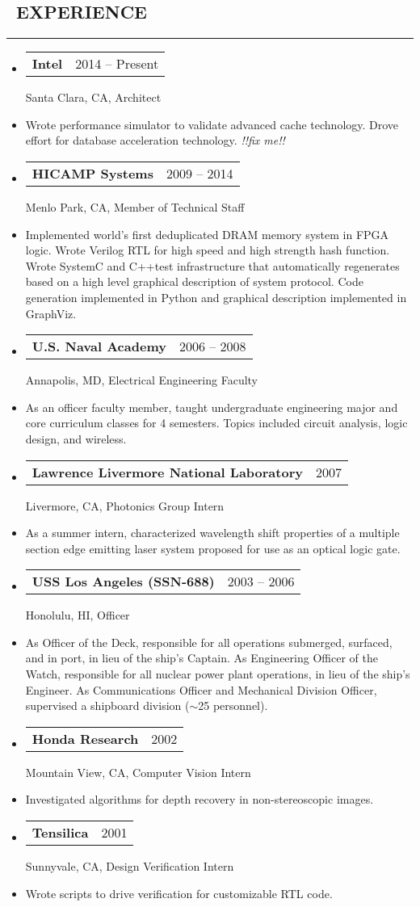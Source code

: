 \documentclass[10pt,letterpaper]{article}
\makeatletter
\newenvironment{resumesection}[1]
{%
    \subsection*{\ \textcolor{light-gray}{#1} }
    \vspace{-0.4em}
    \begin{samepage}
    \hrule
    \end{samepage}
    \vspace{+0.4em}
    \begin{itemize}[leftmargin=0.15cm]
        \parskip=0.1em
}%
{%
    \end{itemize}
}%
\newcommand{\myitem}[1] {
    \item[] \textcolor{dark-gray}{#1}
}
\newcommand{\headertri}[3] {
    \item[] \begin{tabular*}{\linewidth}{l@{\extracolsep{\fill}}r}
    \textbf{#1} & #2 \\
    \end{tabular*}
    #3
}
\newcommand{\CPP}
{C++}
\newcommand{\cminiw}{0.075}
\newcommand{\rminiw}{0.550}
\makeatother
\begin{document}
\begin{minipage}[t]{\cminiw\textwidth}
\end{minipage}\hfill
\begin{minipage}[t]{\rminiw\textwidth}
\begin{resumesection}{EXPERIENCE}
    \headertri
    {Intel}
    {2014 -- Present}
    {Santa Clara, CA, Architect}
    \myitem{Wrote performance simulator to validate advanced cache technology.
            Drove effort for database acceleration technology.
            \textit{!!fix me!!}}
    
    \headertri
    {HICAMP Systems}
    {2009 -- 2014}
    {Menlo Park, CA, Member of Technical Staff}
    \myitem{Implemented world's first deduplicated DRAM memory system in FPGA logic.
            Wrote Verilog RTL for high speed and high strength hash function.
            Wrote SystemC and \CPP  test infrastructure that automatically regenerates based on a high level graphical description of system protocol.
            Code generation implemented in Python and graphical description implemented in GraphViz.}
    
    \headertri
    {U.S. Naval Academy}
    {2006 -- 2008}
    {Annapolis, MD, Electrical Engineering Faculty}
    \myitem{As an officer faculty member, taught undergraduate engineering major and core curriculum classes for 4 semesters.
            Topics included circuit analysis, logic design, and wireless.}
    
    \headertri
    {Lawrence Livermore National Laboratory}
    {2007}
    {Livermore, CA, Photonics Group Intern}
    \myitem{As a summer intern, characterized wavelength shift properties of a multiple section edge emitting laser system proposed for use as an optical logic gate.}
    
    \headertri
    {USS Los Angeles (SSN-688)}
    {2003 -- 2006}
    {Honolulu, HI, Officer}
    \myitem{As Officer of the Deck, responsible for all operations submerged, surfaced, and in port, in lieu of the ship's Captain.
            As Engineering Officer of the Watch, responsible for all nuclear power plant operations, in lieu of the ship's Engineer.
            As Communications Officer and Mechanical Division Officer, supervised a shipboard division ({\footnotesize{$\sim$}}25 personnel).}
    
    \headertri
    {Honda Research}
    {2002}
    {Mountain View, CA, Computer Vision Intern}
    \myitem{Investigated algorithms for depth recovery in non-stereoscopic images.}
    
    \headertri
    {Tensilica}
    {2001}
    {Sunnyvale, CA, Design Verification Intern}
    \myitem{Wrote scripts to drive verification for customizable RTL code.}
\end{resumesection}

\end{minipage}
\end{document}
